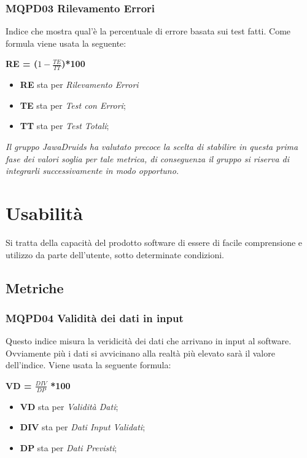 \subsubsection{MQPD03 Rilevamento Errori} \label{QualitàDelProdottoAffidabilitàMetricheMQPD03}
Indice che mostra qual’è la percentuale di errore basata sui test fatti. Come formula viene usata la seguente:
\begin{center}
	\textbf{RE = ($1-\frac{TE}{TT}$)*100}
\end{center}
\begin{itemize}
	\item \textbf{RE} sta per \textit{Rilevamento Errori}
	\item \textbf{TE} sta per \textit{Test con Errori};
	\item \textbf{TT} sta per \textit{Test Totali};
\end{itemize}
\textit{Il gruppo JawaDruids ha valutato precoce la scelta di stabilire in questa prima fase dei valori soglia per tale metrica, di conseguenza il gruppo si riserva di integrarli successivamente in modo opportuno.}

\section{Usabilità}\label{QualitàDelProdottoUsabilità}
Si tratta della capacità del prodotto software di essere di facile comprensione e utilizzo da parte dell’utente, sotto determinate condizioni. 
\subsection{Metriche} \label{QualitàDelProdottoUsabilitàMetriche}
\subsubsection{MQPD04 Validità dei dati in input} \label{QualitàDelProdottoUsabilitàMetricheMQPD04}
Questo indice misura la veridicità dei dati che arrivano in input al software. Ovviamente più i dati si avvicinano alla realtà più elevato sarà il valore dell’indice.
Viene usata la seguente formula:
\begin{center}
	\textbf{VD = $\frac{DIV}{DP}$ *100}
\end{center}
\begin{itemize}
	\item \textbf{VD} sta per \textit{Validità Dati};
	\item \textbf{DIV} sta per \textit{Dati Input Validati};
	\item \textbf{DP} sta per \textit{Dati Previsti};
\end{itemize}

